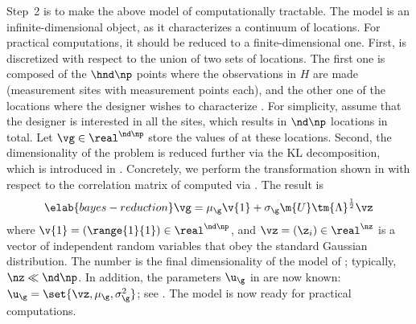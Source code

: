 Step~2 is to make the above model of \g computationally tractable. The model is
an infinite-dimensional object, as it characterizes a continuum of locations.
For practical computations, it should be reduced to a finite-dimensional one.
First, \g is discretized with respect to the union of two sets of locations. The
first one is composed of the $\hnd \np$ points where the observations in $H$ are
made (\hnd measurement sites with \np measurement points each), and the other
one of the locations where the designer wishes to characterize \g. For
simplicity, assume that the designer is interested in all the sites, which
results in $\nd \np$ locations in total. Let $\vg \in \real^{\nd \np}$ store the
values of \g at these locations. Second, the dimensionality of the problem is
reduced further via the \ac{KL} decomposition, which is introduced in
. Concretely, we perform the transformation
shown in  with respect to the correlation matrix of
\vg computed via . The result is
\begin{equation} \elab{bayes-reduction}
  \vg = \mu_\g \v{1} + \sigma_\g \m{U} \tm{\Lambda}^\frac{1}{2} \vz
\end{equation}
where $\v{1} = (\range{1}{1}) \in \real^{\nd \np}$, and $\vz = (\z_i) \in
\real^\nz$ is a vector of independent random variables that obey the standard
Gaussian distribution. The number \nz is the final dimensionality of the model
of \g; typically, $\nz \ll \nd \np$. In addition, the parameters $\u_\g$ in
 are now known: $\u_\g = \set{\vz, \mu_\g,
\sigma^2_\g}$; see . The model is now ready for
practical computations.

